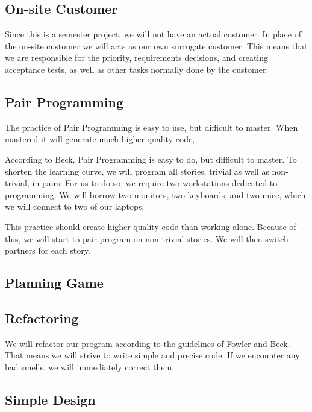 \subsection{On-site Customer}
Since this is a semester project, we will not have an actual customer.
In place of the on-site customer we will acts as our own surrogate customer.
This means that we are responsible for the priority, requirements decisions, and creating acceptance tests, as well as other tasks normally done by the customer.

\subsection{Pair Programming}
The practice of Pair Programming is easy to use, but difficult to master.
When mastered it will generate much higher quality code, 


According to Beck, Pair Programming is easy to do, but difficult to master.
To shorten the learning curve, we will program all stories, trivial as well as non-trivial, in pairs.
For us to do so, we require two workstations dedicated to programming.
We will borrow two monitors, two keyboards, and two mice, which we will connect to two of our laptops.

This practice should create higher quality code than working alone.
Because of this, we will start to pair program on non-trivial stories.
We will then switch partners for each story. 


\subsection{Planning Game}


\subsection{Refactoring}
We will refactor our program according to the guidelines of Fowler and Beck.
That means we will strive to write simple and precise code.
If we encounter any bad smells, we will immediately correct them.

\subsection{Simple Design}


